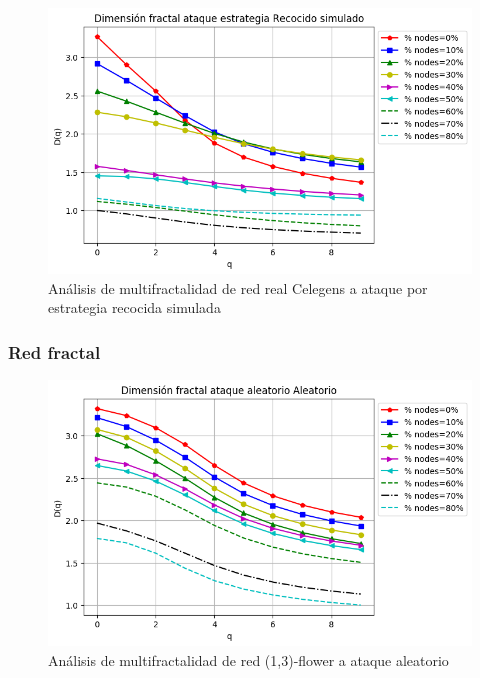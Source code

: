 \begin{figure}[H]
    \centering
    \includegraphics[scale=0.7]{Capitulo6MultifractalidadYRobustez/imagenes/grafica_DqSimulated20180508_020345Celengs.png}
    \caption{Análisis de multifractalidad de red real Celegens a ataque por estrategia recocida simulada }
\end{figure}

\subsubsection{Red fractal}
\begin{figure}[H]
    \centering
    \includegraphics[scale=0.7]{Capitulo6MultifractalidadYRobustez/imagenes/grafica_DqRandom20180501_151350floweru1v3.png}
    \caption{Análisis de multifractalidad de red (1,3)-flower a ataque aleatorio }
\end{figure}

